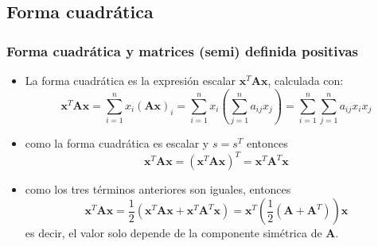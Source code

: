 \documentclass{beamer}
\begin{document}
\subsection{Forma cuadrática}
\begin{frame}
\frametitle{Forma cuadrática y matrices (semi) definida positivas}


\begin{itemize}
\item La forma cuadrática es la expresión escalar $\boldsymbol{x}^T\boldsymbol{A}\boldsymbol{x}$, calculada con: 
\begin{equation*}
\boldsymbol{x}^T\boldsymbol{A}\boldsymbol{x}= \sum_{i=1}^{n} x_{i} (\boldsymbol{A}\boldsymbol{x})_{i} = \sum_{i=1}^{n} x_{i} \left( \sum_{j=1}^{n} a_{ij}x_{j}\right)=  \sum_{i=1}^{n}\sum_{j=1}^{n} a_{ij}x_{i}x_{j}
\end{equation*} 
\item como la forma cuadrática es escalar y $s=s^T$ entonces 
\begin{equation*}
\boldsymbol{x}^T\boldsymbol{A}\boldsymbol{x}= (\boldsymbol{x}^T\boldsymbol{A}\boldsymbol{x})^T= \boldsymbol{x}^T\boldsymbol{A}^T\boldsymbol{x}
\end{equation*}

\item como los tres términos anteriores son iguales, entonces
\begin{equation*}
\boldsymbol{x}^T\boldsymbol{A}\boldsymbol{x}=\frac{1}{2} (\boldsymbol{x}^T\boldsymbol{A}\boldsymbol{x}+ \boldsymbol{x}^T\boldsymbol{A}^T\boldsymbol{x})= \boldsymbol{x}^T \left( \frac{1}{2} (\boldsymbol{A}+\boldsymbol{A}^T)\right)  \boldsymbol{x} 
\end{equation*}
es decir, el valor solo depende de la componente simétrica de $\boldsymbol{A}$.
\end{itemize}
\end{frame}
\end{document}
